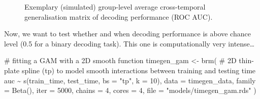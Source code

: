 \documentclass[
  doc,
  floatsintext,
  longtable,
  a4paper,
  nolmodern,
  notxfonts,
  notimes,
  colorlinks=true,linkcolor=blue,citecolor=blue,urlcolor=blue]{apa7}
\newenvironment{Shaded}{\begin{snugshade}}{\end{snugshade}}
\newcommand{\AttributeTok}[1]{\textcolor[rgb]{0.40,0.45,0.13}{#1}}
\newcommand{\CommentTok}[1]{\textcolor[rgb]{0.37,0.37,0.37}{#1}}
\newcommand{\DecValTok}[1]{\textcolor[rgb]{0.68,0.00,0.00}{#1}}
\newcommand{\FunctionTok}[1]{\textcolor[rgb]{0.28,0.35,0.67}{#1}}
\newcommand{\NormalTok}[1]{\textcolor[rgb]{0.00,0.23,0.31}{#1}}
\newcommand{\OtherTok}[1]{\textcolor[rgb]{0.00,0.23,0.31}{#1}}
\newcommand{\SpecialCharTok}[1]{\textcolor[rgb]{0.37,0.37,0.37}{#1}}
\newcommand{\StringTok}[1]{\textcolor[rgb]{0.13,0.47,0.30}{#1}}
\begin{document}
\begin{figure}[!htb]

\caption{\label{fig-sim-timegen}Exemplary (simulated) group-level
average cross-temporal generalisation matrix of decoding performance
(ROC AUC).}


\end{figure}%

Now, we want to test whether and when decoding performance is above
chance level (0.5 for a binary decoding task). This one is
computationally very intense\ldots{}

\begin{Shaded}
\begin{Highlighting}[]
\CommentTok{\# fitting a GAM with a 2D smooth function}
\NormalTok{timegen\_gam }\OtherTok{\textless{}{-}} \FunctionTok{brm}\NormalTok{(}
    \CommentTok{\# 2D thin{-}plate spline (tp) to model smooth interactions between training and testing time}
\NormalTok{    auc }\SpecialCharTok{\textasciitilde{}} \FunctionTok{s}\NormalTok{(train\_time, test\_time, }\AttributeTok{bs =} \StringTok{"tp"}\NormalTok{, }\AttributeTok{k =} \DecValTok{10}\NormalTok{),}
    \AttributeTok{data =}\NormalTok{ timegen\_data,}
    \AttributeTok{family =} \FunctionTok{Beta}\NormalTok{(),}
    \AttributeTok{iter =} \DecValTok{5000}\NormalTok{,}
    \AttributeTok{chains =} \DecValTok{4}\NormalTok{,}
    \AttributeTok{cores =} \DecValTok{4}\NormalTok{,}
    \AttributeTok{file =} \StringTok{"models/timegen\_gam.rds"}
\NormalTok{    )}
\end{Highlighting}
\end{Shaded}
\end{document}
